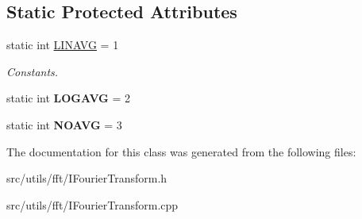\subsection*{Static Protected Attributes}
\begin{DoxyCompactItemize}
\item 
\mbox{\label{class_i_fourier_transform_ab55669ab5299907f66c48266ac90f6a0}} 
static int \hyperlink{class_i_fourier_transform_ab55669ab5299907f66c48266ac90f6a0}{L\+I\+N\+A\+VG} = 1
\begin{DoxyCompactList}\small\item\em Constants. \end{DoxyCompactList}\item 
\mbox{\label{class_i_fourier_transform_a8c6c3bbee8dde5a5a69cfb1fa384ee4f}} 
static int {\bfseries L\+O\+G\+A\+VG} = 2
\item 
\mbox{\label{class_i_fourier_transform_a380b5ed9463f1052284d3b0c9846cec8}} 
static int {\bfseries N\+O\+A\+VG} = 3
\end{DoxyCompactItemize}


The documentation for this class was generated from the following files\+:\begin{DoxyCompactItemize}
\item 
src/utils/fft/I\+Fourier\+Transform.\+h\item 
src/utils/fft/I\+Fourier\+Transform.\+cpp\end{DoxyCompactItemize}
